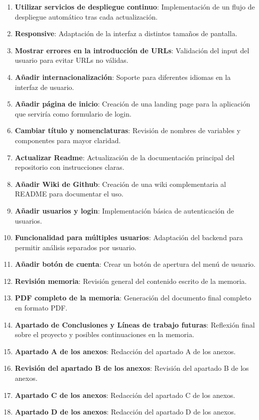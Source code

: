 \begin{enumerate}
\item \textbf{Utilizar servicios de despliegue continuo}: Implementación de un flujo de despliegue automático tras cada actualización.
\item \textbf{Responsive}: Adaptación de la interfaz a distintos tamaños de pantalla.
\item \textbf{Mostrar errores en la introducción de URLs}: Validación del input del usuario para evitar URLs no válidas.
\item \textbf{Añadir internacionalización}: Soporte para diferentes idiomas en la interfaz de usuario.
\item \textbf{Añadir página de inicio}: Creación de una landing page para la aplicación que serviría como formulario de login.
\item \textbf{Cambiar título y nomenclaturas}: Revisión de nombres de variables y componentes para mayor claridad.
\item \textbf{Actualizar Readme}: Actualización de la documentación principal del repositorio con instrucciones claras.
\item \textbf{Añadir Wiki de Github}: Creación de una wiki complementaria al README para documentar el uso.
\item \textbf{Añadir usuarios y login}: Implementación básica de autenticación de usuarios.
\item \textbf{Funcionalidad para múltiples usuarios}: Adaptación del backend para permitir análisis separados por usuario.
\item \textbf{Añadir botón de cuenta}: Crear un botón de apertura del menú de usuario.
\item \textbf{Revisión memoria}: Revisión general del contenido escrito de la memoria.
\item \textbf{PDF completo de la memoria}: Generación del documento final completo en formato PDF.
\item \textbf{Apartado de Conclusiones y Líneas de trabajo futuras}: Reflexión final sobre el proyecto y posibles continuaciones en la memoria.
\item \textbf{Apartado A de los anexos}: Redacción del apartado A de los anexos.
\item \textbf{Revisión del apartado B de los anexos}: Revisión del apartado B de los anexos.
\item \textbf{Apartado C de los anexos}: Redacción del apartado C de los anexos.
\item \textbf{Apartado D de los anexos}: Redacción del apartado D de los anexos.

\end{enumerate}
